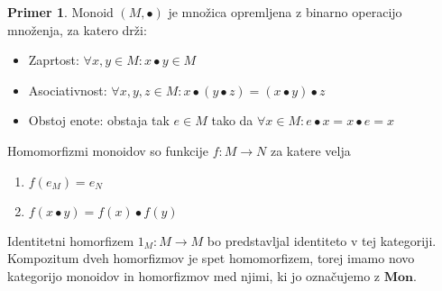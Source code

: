 \documentclass[12pt,a4paper]{book}
\theoremstyle{definition}
\theoremstyle{plain}
\theoremstyle{definition}
\newtheorem{primer}{Primer}[section]
\theoremstyle{remark}
\newcommand{\cat}[1]{\textbf{#1}}
\begin{document}
\begin{primer}
Monoid $(M, \bullet)$ je množica opremljena z binarno operacijo množenja, za katero drži:
\begin{itemize}
\item Zaprtost: $\forall x,y \in M : x \bullet y \in M$
\item Asociativnost: $\forall x,y,z \in M : x \bullet ( y \bullet z ) = ( x \bullet y ) \bullet z$
\item Obstoj enote: obstaja tak $e \in M$ tako da $\forall x \in M : e \bullet x = x \bullet e = x$
\end{itemize}
Homomorfizmi monoidov so funkcije $f : M \to N$ za katere velja
\begin{enumerate}
\item $f(e_M) = e_N$
\item $f(x \bullet y) = f(x) \bullet f(y)$
\end{enumerate}
Identitetni homorfizem $1_M : M \to M$ bo predstavljal identiteto v tej kategoriji. Kompozitum dveh homorfizmov je spet homomorfizem, torej imamo novo kategorijo monoidov in homorfizmov med njimi, ki jo označujemo z $\cat{Mon}$.
\end{primer}
\end{document}
